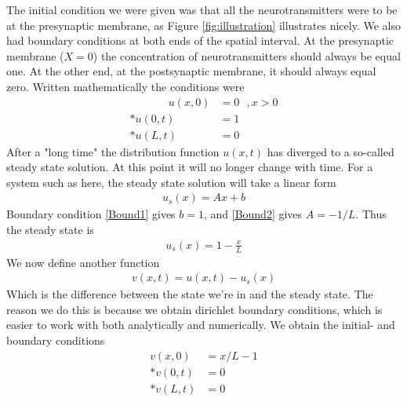 \documentclass[norsk, a4paper]{article}
\begin{document}
The initial condition we were given was that all the neurotransmitters were to be at the presynaptic membrane, as Figure \ref{fig:illustration} illustrates nicely. We also had boundary conditions at both ends of the spatial interval. At the presynaptic membrane ($X=0$) the concentration of neurotransmitters should always be equal one. At the other end, at the postsynaptic membrane, it should always equal zero. Written mathematically the conditions were
\begin{align}
\phantom{~~~, x>0}u(x,0) &= 0~~~, x>0 \label{init}\\*
u(0,t) &= 1    \label{Bound1} \\*
u(L,t) &= 0    \label{Bound2}
\end{align} 
After a "long time" the distribution function $u(x,t)$ has diverged to a so-called steady state solution. At this point it will no longer change with time. For a system such as here, the steady state solution will take a linear form
\begin{align*}
u_s(x) = Ax+b
\end{align*}
Boundary condition \eqref{Bound1} gives $b=1$, and \eqref{Bound2} gives $A = -1/L$. Thus the steady state is
\begin{align}
u_s(x) = 1-\frac{x}{L} \label{sss}
\end{align}
We now define another function
\begin{align}
v(x,t) = u(x,t) - u_s(x)    \label{vfunction}
\end{align}
Which is the difference between the state we're in and the steady state. The reason we do this is because we obtain dirichlet boundary conditions, which is easier to work with both analytically and numerically. We obtain the initial- and boundary conditions
\begin{align}
v(x,0) &= x/L -1     \label{vinit} \\*
v(0,t) &= 0    \label{vBound1} \\*
v(L,t) &= 0    \label{vBound2}
\end{align} 
\end{document}

